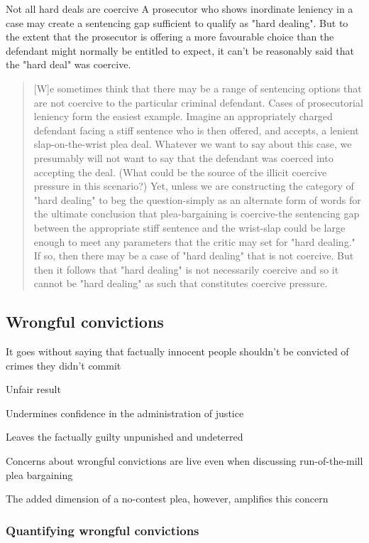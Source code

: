 Not all hard deals are coercive
A prosecutor who shows inordinate leniency in a case may create a sentencing gap sufficient to qualify as "hard dealing". But to the extent that the prosecutor is offering a more favourable choice than the defendant might normally be entitled to expect, it can't be reasonably said that the "hard deal" was coercive.

\begin{quote}
    [W]e sometimes think that there may be a range of sentencing options that are not coercive to the particular criminal defendant. Cases of prosecutorial leniency form the easiest example. Imagine an appropriately charged defendant facing a stiff sentence who is then offered, and accepts, a lenient slap-on-the-wrist plea deal. Whatever we want to say about this case, we presumably will not want to say that the defendant was coerced into accepting the deal. (What could be the source of the illicit coercive pressure in this scenario?) Yet, unless we are constructing the category of "hard dealing" to beg the question-simply as an alternate form of words for the ultimate conclusion that plea-bargaining is coercive-the sentencing gap between the appropriate stiff sentence and the wrist-slap could be large enough to meet any parameters that the critic may set for "hard dealing." If so, then there may be a case of "hard dealing" that is not coercive. But then it follows that "hard dealing" is not necessarily coercive and so it cannot be "hard dealing" as such that constitutes coercive pressure.
\end{quote}




\subsection{Wrongful convictions}

It goes without saying that factually innocent people shouldn't be convicted of crimes they didn't commit

Unfair result

Undermines confidence in the administration of justice

Leaves the factually guilty unpunished and undeterred

Concerns about wrongful convictions are live even when discussing run-of-the-mill plea bargaining

The added dimension of a no-contest plea, however, amplifies this concern

\subsubsection{Quantifying wrongful convictions}



